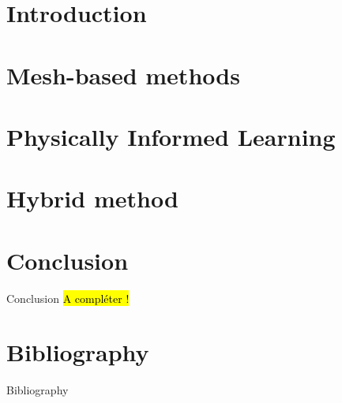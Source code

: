 \documentclass[compress,10pt,xcolor={table,dvipsnames},t]{beamer}
\begin{document}
	\section{Introduction}
	
	
	\section{Mesh-based methods}
	
	
	\section{Physically Informed Learning}
	
	
	\section{Hybrid method}
	
	
	
%	
%	
%	
	
	\section{Conclusion} %
	
	\begin{frame}[label={lastslide}]{Conclusion}
		\hl{A compléter !}
	\end{frame}
	
	\section{Bibliography}
	
	{ 
		\begin{frame}{Bibliography}
			\small
			\printbibliography[heading=none]
		\end{frame}
	}
	\addtocounter{framenumber}{-2} 
	
	\appendix
	
	
	
\end{document}
